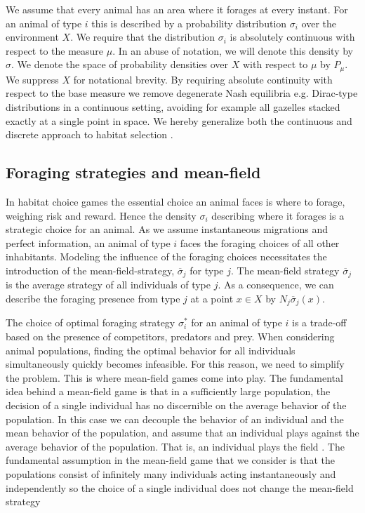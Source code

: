 We assume that every animal has an area where it forages at every instant. For an animal of type $i$ this is described by a probability distribution $\sigma_i$ over the environment $X$. We require that the distribution $\sigma_i$ is absolutely continuous with respect to the measure $\mu$. In an abuse of notation, we will denote this density by $\sigma$. We denote the space of probability densities over $X$ with respect to $\mu$ by $P_{\mu}$. We suppress $X$ for notational brevity. By requiring absolute continuity with respect to the base measure we remove degenerate Nash equilibria e.g. Dirac-type distributions in a continuous setting, avoiding for example all gazelles stacked exactly at a single point in space. We hereby generalize both the continuous and discrete approach to habitat selection \citep{fretwell1969territorial, broom2013game, verticalmigration}.


\subsection{Foraging strategies and mean-field}
In habitat choice games the essential choice an animal faces is where to forage, weighing risk and reward. Hence the density $\sigma_i$ describing where it forages is a strategic choice for an animal. As we assume instantaneous migrations and perfect information, an animal of type $i$ faces the foraging choices of all other inhabitants. Modeling the influence of the foraging choices necessitates the introduction of the mean-field-strategy, $\overbar{\sigma}_j$ for type $j$. The mean-field strategy $\overbar{\sigma}_j$ is the average strategy of all individuals of type $j$. As a consequence, we can describe the foraging presence from type $j$ at a point $x\in X$ by $N_j \overbar{\sigma}_j(x)$.

The choice of optimal foraging strategy $\sigma_i^*$ for an animal of type $i$ is a trade-off based on the presence of competitors, predators and prey. When considering animal populations, finding the optimal behavior for all individuals simultaneously quickly becomes infeasible. For this reason, we need to simplify the problem. This is where mean-field games come into play. The fundamental idea behind a mean-field game is that in a sufficiently large population, the decision of a single individual has no discernible on the average behavior of the population. In this case we can decouple the behavior of an individual and the mean behavior of the population, and assume that an individual plays against the average behavior of the population. That is, an individual plays the field \citep{smith1982evolution}. The fundamental assumption in the mean-field game that we consider is that the populations consist of infinitely many individuals acting instantaneously and independently so the choice of a single individual does not change the mean-field strategy \citep{aumann1964markets}


